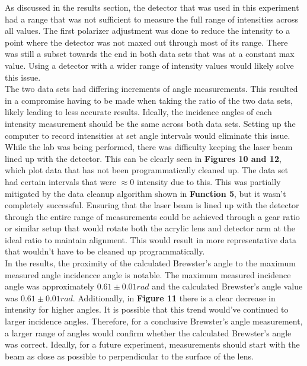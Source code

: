 \documentclass[
	letterpaper, %
	10pt, %
]{CSUniSchoolLabReport}
\begin{document}
As discussed in the results section, the detector that was used in this experiment had a range that was not sufficient to measure
the full range of intensities across all values. The first polarizer adjustment was done to reduce the
intensity to a point where the detector was not maxed out through most of its range. There was still a subset
towards the end in both data sets that was at a constant max value. Using a detector with a wider
range of intensity values would likely solve this issue.\\

The two data sets had differing increments of angle measurements. This resulted in a compromise having to be
made when taking the ratio of the two data sets, likely leading to less accurate results. Ideally, the
incidence angles of each intensity measurement should be the same across both data sets. Setting up the
computer to record intensities at set angle intervals would eliminate this issue.\\

While the lab was being performed, there was difficulty keeping the laser beam lined up with the detector.
This can be clearly seen in \textbf{Figures 10 and 12}, which plot data that has not been programmatically cleaned up.
The data set had certain intervals that were $\approx 0$ intensity due to this. This was partially
mitigated by the data cleanup algorithm shown in \textbf{Function 5}, but it wasn't completely successful.
Ensuring that the laser beam is lined up with the detector through the entire range of measurements
could be achieved through a gear ratio or similar setup that would rotate both the acrylic lens and detector
arm at the ideal ratio to maintain alignment. This would result in more representative data that
wouldn't have to be cleaned up programmatically.\\

In the results, the proximity of the calculated Brewster's angle to the maximum measured angle
incidencce angle is notable. The maximum measured incidence angle was approximately $0.61\pm0.01rad$
and the calculated Brewster's angle value was $0.61\pm0.01rad$. Additionally, in \textbf{Figure 11} there is a
clear decrease in intensity for higher angles. It is possible that this trend would've continued to larger
incidence angles. Therefore, for a conclusive Brewster's angle measurement, a larger range of angles would
confirm whether the calculated Brewster's angle was correct. Ideally, for a future experiment, measurements
should start with the beam as close as possible to perpendicular to the surface of the lens.\\
\end{document}
